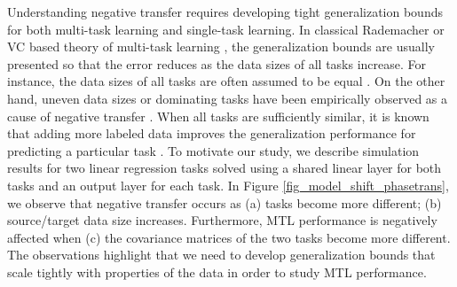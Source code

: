 Understanding negative transfer requires developing tight generalization bounds for both multi-task learning and single-task learning.
In classical Rademacher or VC based theory of multi-task learning \cite{B00,AZ05,M06}, the generalization bounds are usually presented so that the error reduces as the data sizes of all tasks increase.
For instance, the data sizes of all tasks are often assumed to be equal \cite{B00,LPTV09,LPVT11,MPR16}.
On the other hand, uneven data sizes or dominating tasks have been empirically observed as a cause of negative transfer \cite{YKGLHF20}.
When all tasks are sufficiently similar, it is known that adding more labeled data improves the generalization performance for predicting a particular task \cite{WZR20}.
To motivate our study, we describe simulation results for two linear regression tasks solved using a shared linear layer for both tasks and an output layer for each task.
In Figure \ref{fig_model_shift_phasetrans}, we observe that negative transfer occurs as (a) tasks become more different; (b) source/target data size increases.
Furthermore, MTL performance is negatively affected when (c) the covariance matrices of the two tasks become more different.
The observations highlight that we need to develop generalization bounds that scale tightly with properties of the data in order to study MTL performance.

